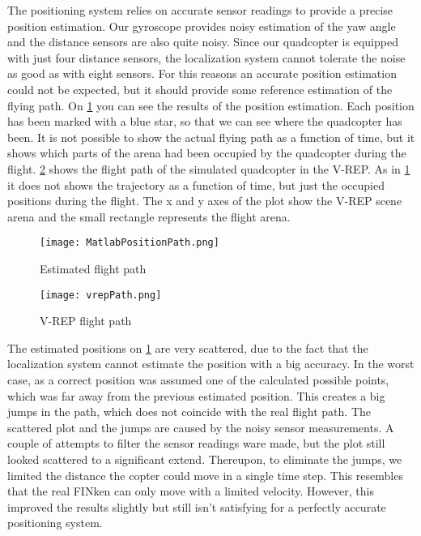 The positioning system relies on accurate sensor readings to provide a precise position estimation. 
Our gyroscope provides noisy estimation of the yaw angle and the distance sensors are also quite noisy. 
Since our quadcopter is equipped with just four distance sensors, the localization system cannot tolerate the noise as good as with eight sensors. 
For this reasons an accurate position estimation could not be expected, but it should provide some reference estimation of the flying path. 
On \ref{fig:matlabPosPath} you can see the results of the position estimation. 
Each position has been marked with a blue star, so that we can see where the quadcopter has been. 
It is not possible to show the actual flying path as a function of time, but it shows which parts of the arena had been occupied by the quadcopter during the flight. 
\ref{fig:vrepPosPath} shows the flight path of the simulated quadcopter in the V-REP. 
As in \ref{fig:matlabPosPath} it does not shows the trajectory as a function of time, but just the occupied positions during the flight. 
The x and y axes of the plot show the V-REP scene arena and the small rectangle represents the flight arena.

\begin{figure}[h!]
 \begin{center}
  \texttt{[image: MatlabPositionPath.png]}
 \end{center}
  \caption{Estimated flight path\label{fig:matlabPosPath}}
\end{figure}

\begin{figure}[h!]
 \begin{center}
  \texttt{[image: vrepPath.png]}
 \end{center}
  \caption{V-REP flight path\label{fig:vrepPosPath}}
\end{figure}

The estimated positions on \ref{fig:matlabPosPath} are very scattered, due to the fact that the localization system cannot estimate the position with a big accuracy. 
In the worst case, as a correct position was assumed one of the calculated possible points, which was far away from the previous estimated position. 
This creates a big jumps in the path, which does not coincide with the real flight path. 
The scattered plot and the jumps are caused by the noisy sensor measurements. 
A couple of attempts to filter the sensor readings ware made, but the plot still looked scattered to a significant extend. 
Thereupon, to eliminate the jumps, we limited the distance the copter could move in a single time step.
This resembles that the real FINken can only move with a limited velocity.
However, this improved the results slightly but still isn't satisfying for a perfectly accurate positioning system.


